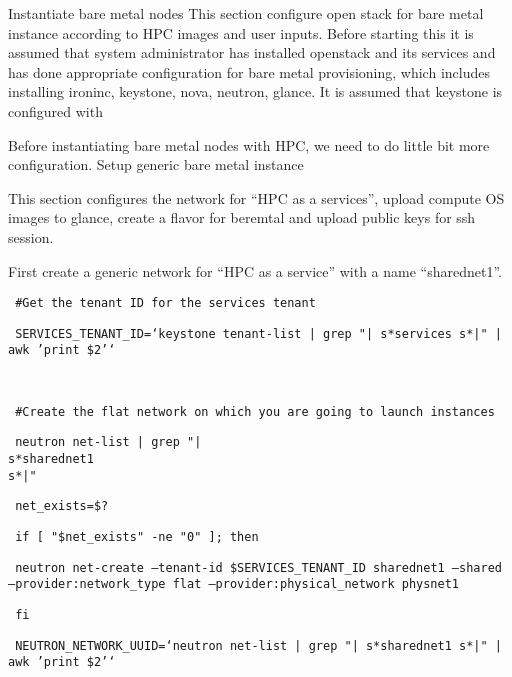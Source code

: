 \documentclass[12pt]{article}
\begin{document}
Instantiate bare metal nodes
This section configure open stack for bare metal instance according to HPC images and user inputs. Before starting this it is assumed that system administrator has installed openstack and its services and has done appropriate configuration for bare metal provisioning, which includes installing ironinc, keystone, nova, neutron, glance. It is assumed that keystone is configured with 

Before instantiating bare metal nodes with HPC, we need to do little bit more configuration. 
Setup generic bare metal instance

This section configures the network for “HPC as a services”, upload compute OS images to glance, create a flavor for beremtal and upload public keys for ssh session.

First create a generic network for “HPC as a service” with a name “sharednet1”.

\begin{bash}\texttt{\small{ \#Get the tenant ID for the services tenant}}\end{bash}
\begin{bash}\texttt{\small{     SERVICES\_TENANT\_ID=`keystone tenant-list | grep "|\\s*services\\s*|" | awk '{print \$2}'`}}\end{bash}
\begin{bash}\texttt{\small{ }}\end{bash}
\begin{bash}\texttt{\small{     \#Create the flat network on which you are going to launch instances}}\end{bash}
\begin{bash}\texttt{\small{     neutron net-list | grep "|\\s*sharednet1\\s*|"}}\end{bash}
\begin{bash}\texttt{\small{     net\_exists=\$?}}\end{bash}
\begin{bash}\texttt{\small{     if [ "\${net\_exists}" -ne "0" ]; then}}\end{bash}
\begin{bash}\texttt{\small{         neutron net-create --tenant-id \${SERVICES\_TENANT\_ID} sharednet1 --shared --provider:network\_type flat --provider:physical\_network physnet1}}\end{bash}
\begin{bash}\texttt{\small{     fi}}\end{bash}
\begin{bash}\texttt{\small{     NEUTRON\_NETWORK\_UUID=`neutron net-list | grep "|\\s*sharednet1\\s*|" | awk '{print \$2}'`}}\end{bash}
\end{document}
